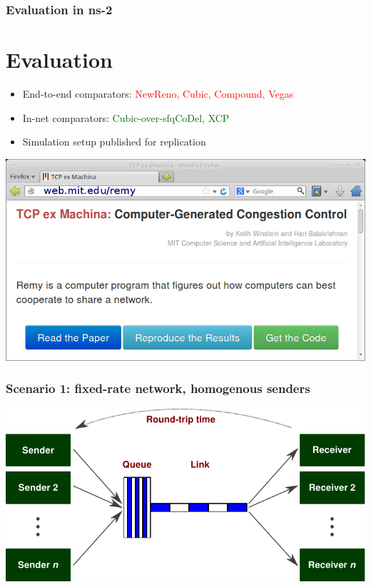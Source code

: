 \documentclass[svgnames]{beamer}
\begin{document}


\begin{frame}
\frametitle{Evaluation in ns-2}

\section{Evaluation}

\begin{itemize}

\item End-to-end comparators: \textcolor{Red}{NewReno, Cubic, Compound, Vegas}

\item In-net comparators: \textcolor{DarkGreen}{Cubic-over-sfqCoDel, XCP}

\item Simulation setup published for replication

\end{itemize}

\begin{centering}
\includegraphics[width=9 cm]{reproducethis.png}

\end{centering}

\end{frame}

\begin{frame}
\frametitle{Scenario 1: fixed-rate network, homogenous senders}

\includegraphics[width=\textwidth]{dumbbell.pdf}

\end{frame}
\end{document}
